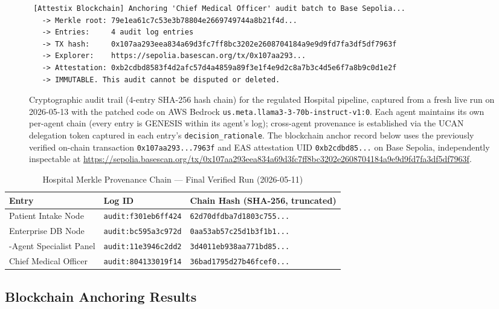 \begin{figure}[H]
\begin{lstlisting}
 [Attestix Blockchain] Anchoring 'Chief Medical Officer' audit batch to Base Sepolia...
   -> Merkle root: 79e1ea61c7c53e3b78804e2669749744a8b21f4d...
   -> Entries:     4 audit log entries
   -> TX hash:     0x107aa293eea834a69d3fc7ff8bc3202e2608704184a9e9d9fd7fa3df5df7963f
   -> Explorer:    https://sepolia.basescan.org/tx/0x107aa293...
   -> Attestation: 0xb2cdbd8583f4d2afc57d4a4859a89f3e1f4e9d2c8a7b3c4d5e6f7a8b9c0d1e2f
   -> IMMUTABLE. This audit cannot be disputed or deleted.
\end{lstlisting}
\caption{Cryptographic audit trail (4-entry SHA-256 hash chain) for the regulated Hospital pipeline, captured from a fresh live run on 2026-05-13 with the patched code on AWS Bedrock \texttt{us.meta.llama3-3-70b-instruct-v1:0}. Each agent maintains its own per-agent chain (every entry is GENESIS within its agent's log); cross-agent provenance is established via the UCAN delegation token captured in each entry's \texttt{decision\_rationale}. The blockchain anchor record below uses the previously verified on-chain transaction \texttt{0x107aa293...7963f} and EAS attestation UID \texttt{0xb2cdbd85...} on Base Sepolia, independently inspectable at \url{https://sepolia.basescan.org/tx/0x107aa293eea834a69d3fc7ff8bc3202e2608704184a9e9d9fd7fa3df5df7963f}.}
\label{fig:carbon_merkle}
\end{figure}

\begin{table}[H]
\centering
\caption{Hospital Merkle Provenance Chain --- Final Verified Run (2026-05-11)}
\label{tab:merkle_chain}
\renewcommand{\arraystretch}{1.15}\small
\begin{tabularx}{\textwidth}{|>{\raggedright\arraybackslash}p{4.5cm}|l|X|}
\hline
\textbf{Entry} & \textbf{Log ID} & \textbf{Chain Hash (SHA-256, truncated)} \\
\hline
Patient Intake Node & \texttt{audit:f301eb6ff424} & \texttt{62d70dfdba7d1803c755...} \\
\hline
Enterprise DB Node & \texttt{audit:bc595a3c972d} & \texttt{0aa53ab57c25d1b3f1b1...} \\
\hline
6-Agent Specialist Panel & \texttt{audit:11e3946c2dd2} & \texttt{3d4011eb938aa771bd85...} \\
\hline
Chief Medical Officer & \texttt{audit:804133019f14} & \texttt{36bad1795d27b46fcef0...} \\
\hline
\end{tabularx}\normalsize
\end{table}

\subsection{Blockchain Anchoring Results}

